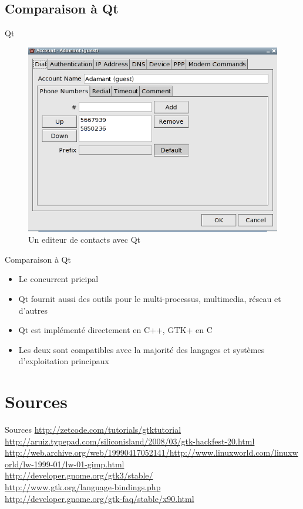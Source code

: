 \documentclass{beamer}
\begin{document}
  \subsection{Comparaison à Qt}
  \begin{frame}{Qt}
    \begin{figure}[htb]
    \centering
    \includegraphics[scale=0.45]{"qt"}
    \caption{Un editeur de contacts avec Qt}
    \label{fig:qt}
    \end{figure}
  \end{frame}
  \begin{frame}{Comparaison à Qt}
  \begin{itemize}
    \item Le concurrent pricipal\\
    \item Qt fournit aussi des outils pour le multi-processus, multimedia, réseau et d'autres\\
    \item Qt est implémenté directement en C++, GTK+ en C\\
    \item Les deux sont compatibles avec la majorité des langages et systèmes d'exploitation principaux
  \end{itemize}
  \end{frame}

  \section{Sources}
  \begin{frame}{Sources}
  	\url{http://zetcode.com/tutorials/gtktutorial}\\
    \url{http://aruiz.typepad.com/siliconisland/2008/03/gtk-hackfest-20.html}\\
		\url{http://web.archive.org/web/19990417052141/http://www.linuxworld.com/linuxworld/lw-1999-01/lw-01-gimp.html}\\
		\url{http://developer.gnome.org/gtk3/stable/}\\
    \url{http://www.gtk.org/language-bindings.php}\\
    \url{http://developer.gnome.org/gtk-faq/stable/x90.html}\\
  \end{frame}
\end{document}

